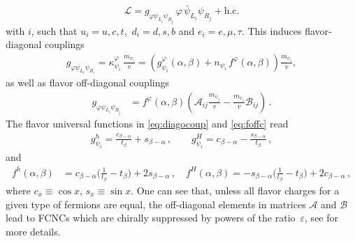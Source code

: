 \begin{equation}\label{eq:newlagrangian}
\mathcal{L}= g_{\varphi \psi_{L_i} \psi_{R_j} }\, \varphi \,\bar \psi_{L_i} \psi_{R_j}+\mathrm{h.c.}
\end{equation}
with $i$, such that $u_i=u, c,t$,\,  $d_i=d,s,b$ and $e_i=e,\mu,\tau$. This induces 
flavor-diagonal couplings 
\begin{align}\label{eq:diagocoup}
g_{\varphi \psi_{L_i}\psi_{R_i}}= \kappa^\varphi_{\psi_i}\, \frac{m_{\psi_i}}{v} =\left(g^{\varphi}_{\psi_i}(\alpha,\beta)+n_{\psi_i}\, f^\varphi(\alpha, \beta)\right)\frac{m_{\psi_i}}{v},
\end{align}
as well as flavor off-diagonal couplings
 \begin{align}\label{eq:foffc}
g_{\varphi \psi_{L_i}\psi_{R_j}}&=  f^\varphi(\alpha, \beta)\left(\mathcal{A}_{ij}\frac{m_{\psi_j}}{v}-\frac{m_{\psi_i}}{v}\mathcal{B}_{ij} \right)\,.
\end{align}
The flavor universal functions in \eqref{eq:diagocoup} and \eqref{eq:foffc} read
\begin{align}
g^h_{\psi_i}=\frac{c_{\beta-\alpha}}{t_\beta}+s_{\beta-\alpha}\,,\qquad g^H_{\psi_i}=c_{\beta-\alpha}-\frac{s_{\beta-\alpha}}{t_\beta}\,,
\end{align}
and
\begin{align}\label{eq:fFs}
f^h(\alpha,\beta)&=c_{\beta-\alpha}\Big(\frac{1}{t_\beta}-t_\beta\Big)+2s_{\beta-\alpha}\,,\quad f^H(\alpha,\beta)=-s_{\beta-\alpha}\Big(\frac{1}{t_\beta}-t_\beta\Big)+2c_{\beta-\alpha}\,,
\end{align}
where $c_{x}\equiv \cos x$, $s_x\equiv \sin x$. One can see that, unless all flavor charges for a given type of fermions are equal, the off-diagonal elements in matrices $\mathcal{A}$ and $\mathcal{B}$ lead to FCNCs which are chirally suppressed by powers of the ratio~$\varepsilon$, see \cite{Bauer:2017cov} for more details.

